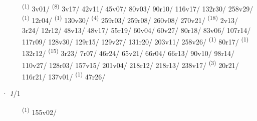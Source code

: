 \begin{description}
    \item[]  \textsuperscript{(1)} \mbox{3v01/} \textsuperscript{(8)} \mbox{3v17/} \mbox{42v11/} \mbox{45v07/} \mbox{80v03/} \mbox{90r10/} \mbox{116v17/} \mbox{132r30/} \mbox{258v29/} \textsuperscript{(1)} \mbox{12r04/} \textsuperscript{(1)} \mbox{130v30/} \textsuperscript{(4)} \mbox{259r03/} \mbox{259r08/} \mbox{260v08/} \mbox{270v21/} \CASEBREAK {} \textsuperscript{(18)} \mbox{2v13/} \mbox{3r24/} \mbox{12r12/} \mbox{48v13/} \mbox{48v17/} \mbox{55r19/} \mbox{60v04/} \mbox{60v27/} \mbox{80r18/} \mbox{83v06/} \mbox{107r14/} \mbox{117r09/} \mbox{128v30/} \mbox{129r15/} \mbox{129v27/} \mbox{131r20/} \mbox{203v11/} \mbox{258v26/} \textsuperscript{(1)} \mbox{80r17/} \textsuperscript{(1)} \mbox{132r12/} \CASEBREAK {} \textsuperscript{(15)} \mbox{3r23/} \mbox{7r07/} \mbox{46r24/} \mbox{65v21/} \mbox{66r04/} \mbox{66r13/} \mbox{90v10/} \mbox{98r14/} \mbox{110v27/} \mbox{128r03/} \mbox{157v15/} \mbox{201v04/} \mbox{218r12/} \mbox{218r13/} \mbox{238v17/} \textsuperscript{(3)} \mbox{20r21/} \mbox{116r21/} \mbox{137v01/} \textsuperscript{(1)} \mbox{47r26/}
\end{description}
\ENTRYEND
\noindent{} · \textit{1}/1 \LEMMALINE
\begin{description}
    \item[]  \textsuperscript{(1)} \mbox{155v02/}
\end{description}
\ENTRYEND
